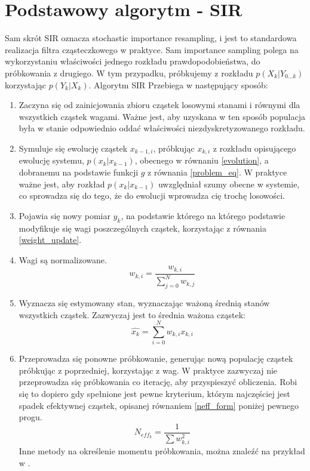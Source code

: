 \section{Podstawowy algorytm - SIR} \label{basic_algorithm}
Sam skrót SIR oznacza stochastic importance resampling, i jest to standardowa realizacja filtra cząsteczkowego w praktyce. Sam importance sampling polega na wykorzystaniu właściwości jednego rozkładu prawdopodobieństwa, do próbkowania z drugiego. W tym przypadku, próbkujemy z rozkładu $p(X_k|Y_{0...k})$ korzystając $p(Y_k|X_k)$.
Algorytm SIR Przebiega w następujący sposób:
\begin{enumerate}[label=(\alph*)]
	\item Zaczyna się od zainicjowania zbioru cząstek losowymi stanami i równymi dla wszystkich cząstek wagami. Ważne jest, aby uzyskana w ten sposób populacja była w stanie odpowiednio oddać właściwości niezdyskretyzowanego rozkładu. \label{pf_init_step}
	
	\item Symuluje się ewolucję cząstek $x_{k-1,i}$, próbkując $x_{k,i}$ z rozkładu opisującego ewolucję systemu, $p(x_k|x_{k-1})$, obecnego w równaniu \ref{evolution}, a dobranemu na podstawie funkcji $g$ z równania \ref{problem_eq}. W praktyce ważne jest, aby rozkład $p(x_k|x_{k-1})$ uwzględniał szumy obecne w systemie, co sprowadza się do tego, że do ewolucji wprowadza cię trochę losowości. \label{pf_drift_step}
	
	\item Pojawia się nowy pomiar $y_k$, na podstawie którego na którego podstawie modyfikuje się wagi poszczególnych cząstek, korzystając z równania \ref{weight_update}. \label{pf_reweight_step}

	\item Wagi są normalizowane. \label{pf_weight_normalization_step}
	\begin{equation}
		w_{k,i}=\frac{w_{k,i}}{\sum_{j=0}^{N} w_{k,j}}
	\end{equation}

	\item Wyznacza się estymowany stan, wyznaczając ważoną średnią stanów wszystkich cząstek. Zazwyczaj jest to średnia ważona cząstek: \label{pf_est_step}
	\begin{equation}
		\hat{x_k} = \sum_{i=0}^{N} w_{k,i} x_{k,i}
	\end{equation}
	\item Przeprowadza się ponowne próbkowanie, generując nową populację cząstek próbkując z poprzedniej, korzystając z wag. W praktyce zazwyczaj nie przeprowadza się próbkowania co iterację, aby przyspieszyć obliczenia. Robi się to dopiero gdy spełnione jest pewne kryterium, którym najczęściej jest spadek efektywnej cząstek, opisanej równaniem \ref{neff_form} poniżej pewnego progu.
	\begin{equation}\label{neff_form}
		N_{eff_k} = \dfrac{1}{\sum w_{k,i}^2}
	\end{equation}
	Inne metody na określenie momentu próbkowania, można znaleźć na przykład w \cite{adaptive_resampling}.\label{resampling_step}
\end{enumerate}
